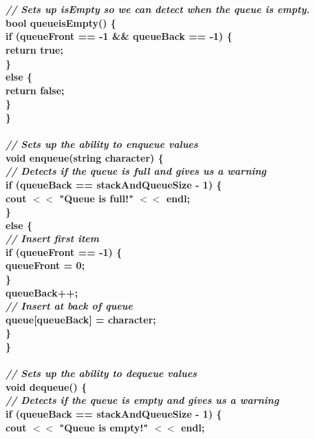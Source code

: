 \documentclass{article}
\begin{document}
\textbf{
\\~\\ \textit{ // Sets up isEmpty so we can detect when the queue is empty.\\ }
bool queueisEmpty() \{\\
    \indent if (queueFront == -1 \&\& queueBack == -1) \{\\
        \indent \indent return true;\\
    \indent \}\\
    \indent else \{\\
        \indent \indent return false;\\
    \indent \}\\
\}\\
\\
\textit{ // Sets up the ability to enqueue values\\ }
void enqueue(string character) \{\\
    \textit{ // Detects if the queue is full and gives us a warning\\ }
    \indent if (queueBack == stackAndQueueSize - 1) \{\\
        \indent \indent cout $<<$ "Queue is full!" $<<$ endl;\\
    \indent \}\\
    \indent else \{\\
        \textit{ \indent \indent // Insert first item\\ }
        \indent \indent if (queueFront == -1) \{\\
            \indent \indent \indent queueFront = 0;\\
        \indent \indent \}\\
        \indent \indent queueBack++;\\
        \textit{ \indent \indent // Insert at back of queue\\ }
        \indent \indent queue[queueBack] = character;\\
    \indent \}\\
\}\\
\\
\textit{ // Sets up the ability to dequeue values\\ }
void dequeue() \{\\
    \textit{ // Detects if the queue is empty and gives us a warning\\ }
    \indent if (queueBack == stackAndQueueSize - 1) \{\\
        \indent \indent cout $<<$ "Queue is empty!" $<<$ endl;\\
}
\end{document}
